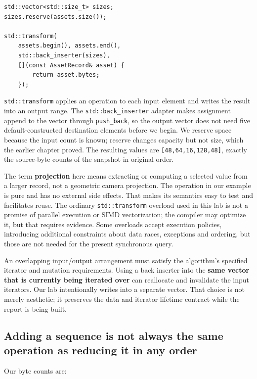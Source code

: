\begin{verbatim}
std::vector<std::size_t> sizes;
sizes.reserve(assets.size());

std::transform(
    assets.begin(), assets.end(),
    std::back_inserter(sizes),
    [](const AssetRecord& asset) {
        return asset.bytes;
    });
\end{verbatim}

\texttt{std::transform} applies an operation to each input element and writes the result into an output range. The \texttt{std::back\_inserter} adapter makes assignment append to the vector through \texttt{push\_back}, so the output vector does not need five default-constructed destination elements before we begin. We reserve space because the input count is known; reserve changes capacity but not size, which the earlier chapter proved. The resulting values are \texttt{{[}48,64,16,128,48{]}}, exactly the source-byte counts of the snapshot in original order.

The term \textbf{projection} here means extracting or computing a selected value from a larger record, not a geometric camera projection. The operation in our example is pure and has no external side effects. That makes its semantics easy to test and facilitates reuse. The ordinary \texttt{std::transform} overload used in this lab is not a promise of parallel execution or SIMD vectorization; the compiler may optimize it, but that requires evidence. Some overloads accept execution policies, introducing additional constraints about data races, exceptions and ordering, but those are not needed for the present synchronous query.

An overlapping input/output arrangement must satisfy the algorithm's specified iterator and mutation requirements. Using a back inserter into the \textbf{same vector that is currently being iterated over} can reallocate and invalidate the input iterators. Our lab intentionally writes into a separate vector. That choice is not merely aesthetic; it preserves the data and iterator lifetime contract while the report is being built.

\subsection{Adding a sequence is not always the same operation as reducing it in any order}\label{05-engine-i-ch006-adding-a-sequence-is-not-always-the-same-operation-as-reducing-it-in-any-order}

Our byte counts are:

